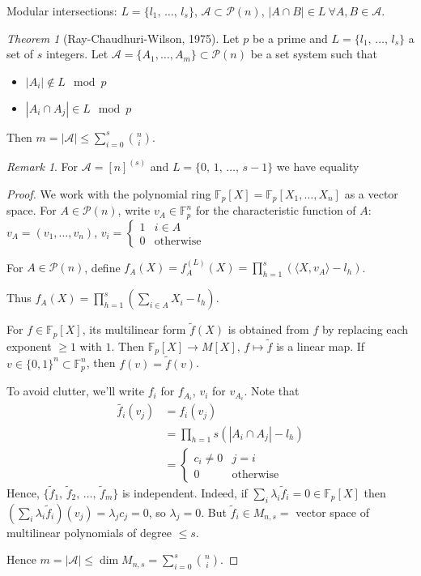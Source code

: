 \documentclass[a4paper]{article}
\theoremstyle{definition}
\theoremstyle{remark}
\newtheorem*{remark}{Remark}
\theoremstyle{default}
\newtheorem{theorem}{Theorem}
\newcommand*\abs[1]{\left|#1\right|}
\begin{document}
Modular intersections: $L=\{l_1,\,\dots,\,l_s\}$,
$\mathcal{A} \subset \mathcal{P}(n)$,
$\abs{A \cap B} \in L\ \forall A,B \in \mathcal{A}$.

\begin{theorem}[Ray-Chaudhuri-Wilson, 1975]
	Let $p$ be a prime and $L=\{l_1,\, \dots,\, l_s\}$ a set of $s$ integers.
	Let $\mathcal{A} = \{A_1,\dots,A_m\} \subset \mathcal{P}(n)$ be a set system such that
	\begin{itemize}
		\item $\abs{A_i} \not\in L \mod p$
		\item $\abs{A_i \cap A_j} \in L \mod p$
	\end{itemize}
	Then $m=\abs{\mathcal{A}} \leq \sum_{i=0}^s {n \choose i}$.
\end{theorem}
\begin{remark}
	For $\mathcal{A} = [n]^{(s)}$ and $L=\{0,\,1,\, \dots,\, s-1\}$ we have equality
\end{remark}
\begin{proof}
	We work with the polynomial ring $\mathbb{F}_p[X] = \mathbb{F}_p[X_1, \dots, X_n]$ as a vector space.
	For $A \in \mathcal{P}(n)$,
	write $v_A \in \mathbb{F}_p^n$ for the characteristic function of $A$: $v_A = (v_1, \dots, v_n)$,
	$v_i = \begin{cases}1 & i \in A \\ 0 & \text{otherwise}\end{cases}$
	
	For $A \in \mathcal{P}(n)$,
	define $f_A(X) = f_A^{(L)}(X) = \prod_{h=1}^s(\langle X, v_A \rangle - l_h)$.
	
	Thus $f_A(X) = \prod_{h=1}^s(\sum_{i \in A}X_i - l_h)$.
	
	For $f \in \mathbb{F}_p[X]$, its multilinear form $\tilde{f}(X)$ is obtained from $f$ by replacing each exponent $\geq 1$ with $1$.
	Then $\mathbb{F}_p[X] \to M[X]$, $f \mapsto \tilde{f}$ is a linear map.
	If $v \in \{0,1\}^n \subset \mathbb{F}_p^n$,
	then $f(v) = \tilde{f}(v)$.
	
	To avoid clutter, we'll write $f_i$ for $f_{A_i}$,
	$v_i$ for $v_{A_i}$.
	Note that
	\begin{align*}
		\tilde{f_i}(v_j) &= f_i(v_j)\\
		&= \prod_{h=1}{s}(\abs{A_i \cap A_j} - l_h) \\
		&= \begin{cases}
		c_i \neq 0 & j=i \\
		0 & \text{otherwise}
		\end{cases}
	\end{align*}
	Hence, $\{\tilde{f}_1,\, \tilde{f}_2,\, \dots,\, \tilde{f}_m \}$ is independent.
	Indeed, if $\sum_i \lambda_i \tilde{f}_i = 0 \in \mathbb{F}_p[X]$ then
	$(\sum_i \lambda_i \tilde{f}_i)(v_j) = \lambda_jc_j = 0$,
	so $\lambda_j = 0$.
	But $\tilde{f}_i \in M_{n,s} =$ vector space of multilinear polynomials of degree $\leq s$.
	
	Hence $m = \abs{\mathcal{A}} \leq \dim M_{n,s} = \sum_{i=0}^s {n \choose i}$.
\end{proof}
\end{document}

